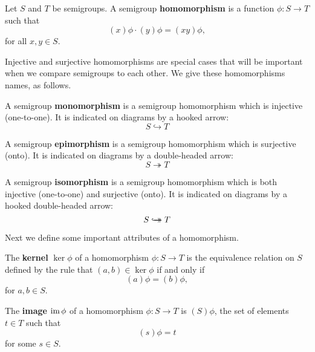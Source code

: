 \begin{definition}
  \label{def:homomorphism}
  Let $S$ and $T$ be semigroups.  A semigroup \textbf{homomorphism} is a
  function $\phi: S \to T$ such that
  $$(x)\phi \cdot (y)\phi = (xy)\phi,$$
  for all $x, y \in S$.
\end{definition}

Injective and surjective homomorphisms are special cases that will be important
when we compare semigroups to each other.  We give these homomorphisms names, as
follows.

\begin{definition}
  \label{def:monomorphism}
  A semigroup \textbf{monomorphism} is a semigroup homomorphism which is
  injective (one-to-one).  It is indicated on diagrams by a hooked arrow:
  $$S \hookrightarrow T$$
\end{definition}

\begin{definition}
  \label{def:epimorphism}
  A semigroup \textbf{epimorphism} is a semigroup homomorphism which is
  surjective (onto).  It is indicated on diagrams by a double-headed arrow:
  $$S \twoheadrightarrow T$$
\end{definition}

\begin{definition}
  \label{def:isomorphism}
  A semigroup \textbf{isomorphism} is a semigroup homomorphism which is
  both injective (one-to-one) and surjective (onto).  It is indicated on
  diagrams by a hooked double-headed arrow:
  $$S \hookrightarrow\mathrel{\mspace{-15mu}}\rightarrow T$$
\end{definition}

Next we define some important attributes of a homomorphism.

\begin{definition}
  \label{def:kernel-homo}
  The \textbf{kernel} $\ker\phi$ of a homomorphism $\phi:S \to T$ is the
  equivalence relation on $S$ defined by the rule that $(a,b) \in \ker\phi$ if
  and only if
  $$(a)\phi = (b)\phi,$$
  for $a, b \in S$.
\end{definition}

\begin{definition}
  \label{def:image}
  The \textbf{image} $\operatorname{im}\phi$ of a homomorphism $\phi:S \to T$ is $(S)\phi$,
  the set of elements $t \in T$ such that
  $$(s)\phi = t$$
  for some $s \in S$.
\end{definition}

